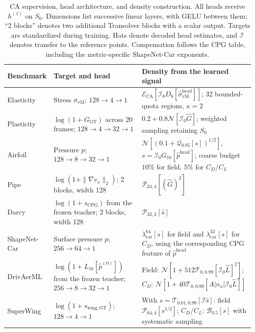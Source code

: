 \begin{table}[!htbp]
    \centering
    \small
    \caption{CA supervision, head architecture, and density construction. All heads receive $h^{(1)}$ on $S_0$. Dimensions list successive linear layers, with GELU between them; ``2 blocks'' denotes two additional Transolver blocks with a scalar output. Targets are standardized during training. Hats denote decoded head estimates, and $\mathcal{I}$ denotes transfer to the reference points. Compensation follows the CPG table, including the metric-specific ShapeNet-Car exponents.}
    \label{tab:ca_density_policies}
    \setlength{\tabcolsep}{4pt}
    \renewcommand{\arraystretch}{1.2}
    \begin{tabular}{@{}>{\raggedright\arraybackslash}p{}>{\raggedright\arraybackslash}p{}>{\raggedright\arraybackslash}p{}@{}}
        \toprule
        Benchmark & Target and head & Density from the learned signal \\
        \midrule
        Elasticity & Stress $\sigma_{\mathrm{vM}}$; $128\to4\to1$ & $\mathcal{E}_{\mathrm{CA}}[\mathcal{I}_8D_8[\widehat\sigma_{\mathrm{vM}}^{\mathrm{head}}]]$; 32 bounded-quota regions, $\kappa=2$ \\
        \addlinespace[4pt]
        Plasticity & $\log(1+G_{\mathrm{GT}})$ across 20 frames; $128\to4\to32\to1$ & $0.2+0.8\mathcal{N}[\mathcal{I}_0\widehat G]$; weighted sampling retaining $S_0$ \\
        \addlinespace[4pt]
        Airfoil & Pressure $p$; $128\to8\to32\to1$ & $\mathcal{N}[(0.1+\mathcal{Q}_{0.95}[s])^{1/2}]$, $s=\mathcal{I}_0G_{16}[\widehat p^{\mathrm{head}}]$; coarse budget $10\%$ for field, $5\%$ for $C_D/C_L$ \\
        \addlinespace[4pt]
        Pipe & $\log(1+\|\nabla v_x\|_2)$; 2 blocks, width 128 & $\mathcal{P}_{24,4}[(\widehat G)^2]$ \\
        \addlinespace[4pt]
        Darcy & $\log(1+s_{\mathrm{CPG}})$ from the frozen teacher; 2 blocks, width 128 & $\mathcal{P}_{32,2}[\widehat s]$ \\
        \addlinespace[4pt]
        ShapeNet-Car & Surface pressure $p$; $256\to64\to1$ & $\lambda_{\mathrm{car}}^{64}[s]$ for field and $\lambda_{\mathrm{car}}^{32}[s]$ for $C_D$, using the corresponding CPG feature of $\widehat p^{\mathrm{head}}$ \\
        \addlinespace[4pt]
        DrivAerML & $\log(1+L_{16}[\widehat p^{(0)}])$ from the frozen teacher; $256\to8\to32\to1$ & Field: $\mathcal{N}[1+512\mathcal{T}_{0,0.99}[\mathcal{I}_0\widehat L]^2]$; $C_D$: $\mathcal{N}[1+40\mathcal{T}_{0,0.99}[A|n_x|\mathcal{I}_0\widehat L]]$ \\
        \addlinespace[4pt]
        SuperWing & $\log(1+s_{\mathrm{wing,GT}})$; $128\to4\to1$ & With $s=\mathcal{T}_{0.01,0.99}[\mathcal{I}\widehat s]$: field $\mathcal{P}_{64,4}[s^{1/2}]$; $C_D/C_L$: $\mathcal{B}_{0.5}[s]$ with systematic sampling \\
        \bottomrule
    \end{tabular}
\end{table}
